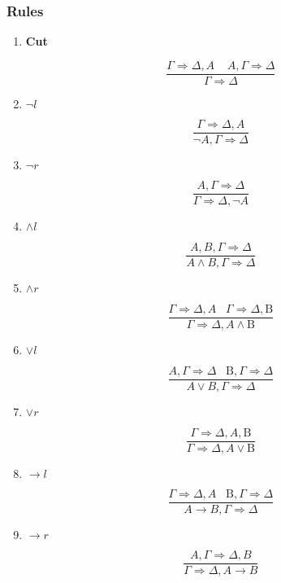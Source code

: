 \documentclass{article}
\begin{document}
\subsubsection{Rules}
\begin{enumerate}
    \item \textbf{Cut}

    $$\frac{\Gamma \Rightarrow \Delta, A \; \; \; \; A, \Gamma \Rightarrow \Delta}{\Gamma \Rightarrow \Delta}$$
    
    \item \textbf{$\neg l$}
    
    $$\frac{\Gamma \Rightarrow \Delta, A}{\neg A, \Gamma \Rightarrow \Delta}$$
    
    \item \textbf{$\neg r$}
    
    $$\frac{A, \Gamma \Rightarrow \Delta}{\Gamma \Rightarrow \Delta, \neg A}$$
    
    \item \textbf{$\wedge l$}
    
    $$\frac{A, B, \Gamma \Rightarrow \Delta}{A \wedge B, \Gamma \Rightarrow \Delta}$$
    
    \item \textbf{$\wedge r$}
    
    $$\frac{\Gamma \Rightarrow \Delta, A \; \; \; \Gamma \Rightarrow \Delta, \mathrm{B}}{\Gamma \Rightarrow \Delta, A \wedge \mathrm{B}}$$
    
    \item \textbf{$\vee l$}
    
    $$\frac{A, \Gamma \Rightarrow \Delta \; \; \; \mathrm{B}, \Gamma \Rightarrow \Delta}{A \vee B, \Gamma \Rightarrow \Delta}$$
    
    \item \textbf{$\vee r$}
    
    $$\frac{\Gamma \Rightarrow \Delta, A, \mathrm{B}}{\Gamma \Rightarrow \Delta, A \vee \mathrm{B}}$$
    
    \item \textbf{$\rightarrow l$}
    
    $$\frac{\Gamma \Rightarrow \Delta, A \; \; \; \mathrm{B}, \Gamma \Rightarrow \Delta}{A \rightarrow B, \Gamma \Rightarrow \Delta}$$
    
    \item \textbf{$\rightarrow r$}
    
    $$\frac{A, \Gamma \Rightarrow \Delta, B}{\Gamma \Rightarrow \Delta, A \rightarrow B}$$
\end{enumerate}
\end{document}
